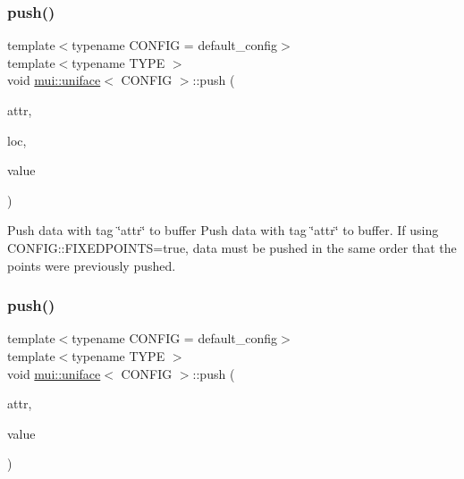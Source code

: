 \subsubsection{\texorpdfstring{push()}{push()}\hspace{0.1cm}{\footnotesize\ttfamily [1/2]}}
{\footnotesize\ttfamily template$<$typename C\+O\+N\+F\+IG  = default\+\_\+config$>$ \\
template$<$typename T\+Y\+PE $>$ \\
void \hyperlink{classmui_1_1uniface}{mui\+::uniface}$<$ C\+O\+N\+F\+IG $>$\+::push (\begin{DoxyParamCaption}\item[{const std\+::string \&}]{attr,  }\item[{const \hyperlink{classmui_1_1uniface_abc356ab801269c69e38dc07179f85ef9}{point\+\_\+type}}]{loc,  }\item[{const T\+Y\+PE}]{value }\end{DoxyParamCaption})\hspace{0.3cm}{\ttfamily [inline]}}



Push data with tag \char`\"{}attr\char`\"{} to buffer Push data with tag \char`\"{}attr\char`\"{} to buffer. If using C\+O\+N\+F\+I\+G\+::\+F\+I\+X\+E\+D\+P\+O\+I\+N\+TS=true, data must be pushed in the same order that the points were previously pushed. 

\mbox{\label{classmui_1_1uniface_ade5db3c4a7fb4524c468e442a56092d7}} 
\subsubsection{\texorpdfstring{push()}{push()}\hspace{0.1cm}{\footnotesize\ttfamily [2/2]}}
{\footnotesize\ttfamily template$<$typename C\+O\+N\+F\+IG  = default\+\_\+config$>$ \\
template$<$typename T\+Y\+PE $>$ \\
void \hyperlink{classmui_1_1uniface}{mui\+::uniface}$<$ C\+O\+N\+F\+IG $>$\+::push (\begin{DoxyParamCaption}\item[{const std\+::string \&}]{attr,  }\item[{const T\+Y\+PE}]{value }\end{DoxyParamCaption})\hspace{0.3cm}{\ttfamily [inline]}}




